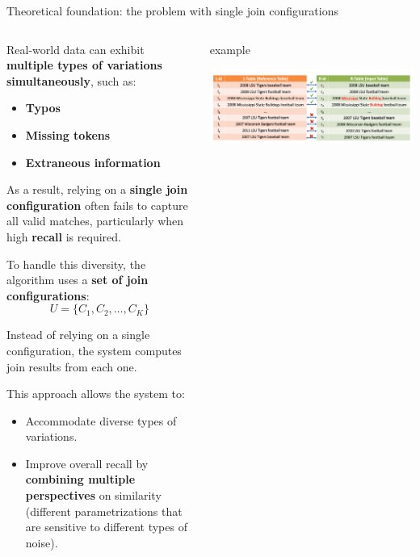 \documentclass[8pt]{beamer} %
\begin{document}
\begin{frame}{Theoretical foundation: the problem with single join configurations}
	
	\begin{columns}
		\begin{column}{0.52\textwidth}
			Real-world data can exhibit \textbf{multiple types of variations simultaneously}, such as:
			\begin{itemize}
				\item \textbf{Typos}
				\item \textbf{Missing tokens}
				\item \textbf{Extraneous information}
			\end{itemize}
			
			As a result, relying on a \textbf{single join configuration} often fails to capture all valid matches, particularly when high \textbf{recall} is required.
			
			\vspace{0.5em}
			To handle this diversity, the algorithm uses a \textbf{set of join configurations}:
			$$
			U = \{C_1, C_2, \dots, C_K\}
			$$
			
			Instead of relying on a single configuration, the system computes join results from each one.
			
			This approach allows the system to:
			\begin{itemize}
				\item Accommodate diverse types of variations.
				\item Improve overall recall by \textbf{combining multiple perspectives} on similarity (different parametrizations that are sensitive to different types of noise).
			\end{itemize}
		\end{column}
		
		
		\begin{column}{0.45\textwidth}
			
			\begin{beamercolorbox}[rounded=true, shadow=true, leftskip=1em, rightskip=1em]{example}
			
				\centering
				\includegraphics[width=\linewidth]{img/Pasted image 20250331152324.png}
				

\end{beamercolorbox}
\end{column}
\end{columns}
\end{frame}
\end{document}
